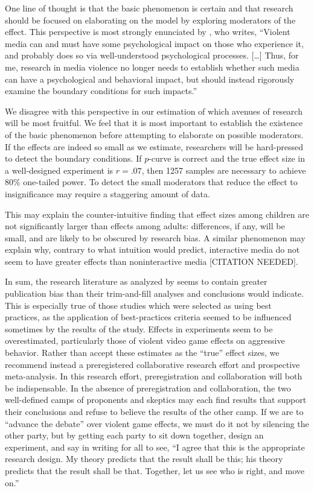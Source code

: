 \documentclass[man]{apa6}
\begin{document}
One line of thought is that the basic phenomenon is certain and that research should be focused on elaborating on the model by exploring moderators of the effect. This perspective is most strongly enunciated by \citet[p. 62]{Warburton:2014}, who writes, %
``Violent media can and must have some psychological impact on those who experience it, and probably does so via well-understood psychological processes. [\ldots] Thus, for me, research in media violence no longer needs to establish whether such media can have a psychological and behavioral impact, but should instead rigorously examine the boundary conditions for such impacts.'' 

We disagree with this perspective in our estimation of which avenues of research will be most fruitful. We feel that it is most important to establish the existence of the basic phenomenon before attempting to elaborate on possible moderators. If the effects are indeed so small as we estimate, researchers will be hard-pressed to detect the boundary conditions. If $p$-curve is correct and the true effect size in a well-designed experiment is $r = .07$, then 1257 samples are necessary to achieve $80\%$ one-tailed power. To detect the small moderators that reduce the effect to insignificance may require a staggering amount of data.

This may explain the counter-intuitive finding that effect sizes among children are not significantly larger than effects among adults: differences, if any, will be small, and are likely to be obscured by research bias. A similar phenomenon may explain why, contrary to what intuition would predict, interactive media do not seem to have greater effects than noninteractive media [CITATION NEEDED].

In sum, the research literature as analyzed by \citep{Anderson:etal:2010} seems to contain greater publication bias than their trim-and-fill analyses and conclusions would indicate. This is especially true of those studies which were selected as using best practices, as the application of best-practices criteria seemed to be influenced sometimes by the results of the study. Effects in experiments seem to be overestimated, particularly those of violent video game effects on aggressive behavior. Rather than accept these estimates as the ``true'' effect sizes, we recommend instead a preregistered collaborative research effort and prospective meta-analysis. In this research effort, preregistration and collaboration will both be indispensable. In the absence of preregistration and collaboration, the two well-defined camps of proponents and skeptics may each find results that support their conclusions and refuse to believe the results of the other camp. If we are to ``advance the debate'' over violent game effects, we must do it not by silencing the other party, but by getting each party to sit down together, design an experiment, and say in writing for all to see, ``I agree that this is the appropriate research design. My theory predicts that the result shall be this; his theory predicts that the result shall be that. Together, let us see who is right, and move on.''
\end{document}
